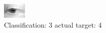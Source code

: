\begin{figure}[h!]
\begin{center}
\includegraphics[width=0.60\columnwidth]{figures/ID2606_class_3_target_4.png}
\end{center}
\caption{ Classification: 3 actual target: 4}
\label{fig:ID2606_class_3_target_4}
\end{figure}
